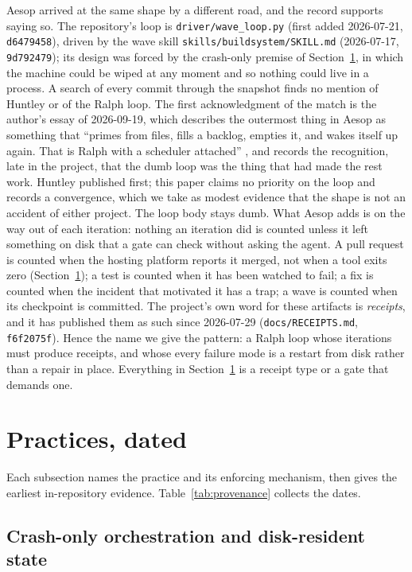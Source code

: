 \documentclass[11pt]{article}
\newcommand{\sha}[1]{\texttt{\small #1}}
\newcommand{\file}[1]{\texttt{\small #1}}
\begin{document}
Aesop arrived at the same shape by a different road, and the record supports saying so. The repository's loop is \file{driver/wave\_loop.py} (first added 2026-07-21, \sha{d6479458}), driven by the wave skill \file{skills/buildsystem/SKILL.md} (2026-07-17, \sha{9d792479}); its design was forced by the crash-only premise of Section~\ref{sec:practices}, in which the machine could be wiped at any moment and so nothing could live in a process. A search of every commit through the snapshot finds no mention of Huntley or of the Ralph loop. The first acknowledgment of the match is the author's essay of 2026-09-19, which describes the outermost thing in Aesop as something that ``primes from files, fills a backlog, empties it, and wakes itself up again. That is Ralph with a scheduler attached'' \cite{nothingnew}, and records the recognition, late in the project, that the dumb loop was the thing that had made the rest work. Huntley published first; this paper claims no priority on the loop and records a convergence, which we take as modest evidence that the shape is not an accident of either project. The loop body stays dumb. What Aesop adds is on the way out of each iteration: nothing an iteration did is counted unless it left something on disk that a gate can check without asking the agent. A pull request is counted when the hosting platform reports it merged, not when a tool exits zero (Section~\ref{sec:practices}); a test is counted when it has been watched to fail; a fix is counted when the incident that motivated it has a trap; a wave is counted when its checkpoint is committed. The project's own word for these artifacts is \emph{receipts}, and it has published them as such since 2026-07-29 (\file{docs/RECEIPTS.md}, \sha{f6f2075f}). Hence the name we give the pattern: a Ralph loop whose iterations must produce receipts, and whose every failure mode is a restart from disk rather than a repair in place. Everything in Section~\ref{sec:practices} is a receipt type or a gate that demands one.

\section{Practices, dated}
\label{sec:practices}

Each subsection names the practice and its enforcing mechanism, then gives the earliest in-repository evidence. Table~\ref{tab:provenance} collects the dates.

\subsection{Crash-only orchestration and disk-resident state}
\end{document}
